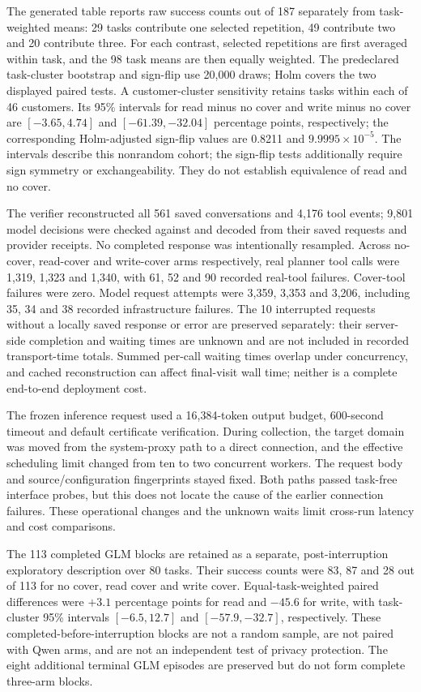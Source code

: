 The generated table reports raw success counts out of 187 separately from
task-weighted means: 29 tasks contribute one selected repetition, 49 contribute
two and 20 contribute three. For each contrast, selected repetitions are first
averaged within task, and the 98 task means are then equally weighted. The
predeclared task-cluster bootstrap and sign-flip use 20,000 draws; Holm covers
the two displayed paired tests. A customer-cluster sensitivity retains tasks
within each of 46 customers. Its 95\% intervals for read minus no cover and
write minus no cover are $[-3.65,4.74]$ and $[-61.39,-32.04]$ percentage
points, respectively; the corresponding Holm-adjusted sign-flip values are
0.8211 and $9.9995\times10^{-5}$. The intervals describe this nonrandom
cohort; the sign-flip tests additionally require sign symmetry or
exchangeability. They do not establish equivalence of read and no cover.



The verifier reconstructed all 561 saved conversations and 4,176 tool events;
9,801 model decisions were checked against and decoded from their saved
requests and provider receipts. No completed response was intentionally
resampled. Across no-cover, read-cover and write-cover arms respectively,
real planner tool calls were 1,319, 1,323 and 1,340, with 61, 52 and 90
recorded real-tool failures. Cover-tool failures were zero. Model request
attempts were 3,359, 3,353 and 3,206, including 35, 34 and 38 recorded
infrastructure failures. The 10 interrupted requests without a locally saved
response or error are preserved separately: their server-side completion and
waiting times are unknown and are not included in recorded transport-time
totals. Summed per-call waiting times overlap under concurrency, and cached
reconstruction can affect final-visit wall time; neither is a complete
end-to-end deployment cost.

The frozen inference request used a 16,384-token output budget, 600-second
timeout and default certificate verification. During collection, the target
domain was moved from the system-proxy path to a direct connection, and the
effective scheduling limit changed from ten to two concurrent workers. The
request body and source/configuration fingerprints stayed fixed. Both paths
passed task-free interface probes, but this does not locate the cause of the
earlier connection failures. These operational changes and the unknown waits
limit cross-run latency and cost comparisons.

The 113 completed GLM blocks are retained as a separate, post-interruption
exploratory description over 80 tasks. Their success counts were 83, 87 and
28 out of 113 for no cover, read cover and write cover. Equal-task-weighted
paired differences were $+3.1$ percentage points for read and $-45.6$ for
write, with task-cluster 95\% intervals $[-6.5,12.7]$ and $[-57.9,-32.7]$,
respectively. These completed-before-interruption blocks are not a random
sample, are not paired with Qwen arms, and are not an independent test of
privacy protection. The eight additional terminal GLM episodes are preserved
but do not form complete three-arm blocks.

